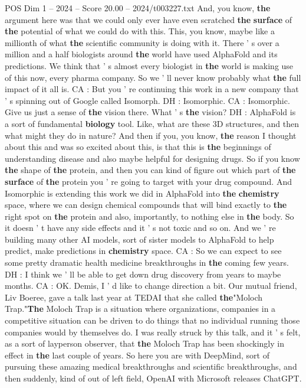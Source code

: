 \begin{textsample}{POS Dim 1 – 2024 – Score 20.00 – 2024/t003227.txt}
And, you know, \textbf{the} argument here was that we could only ever have even scratched \textbf{the} \textbf{surface} of \textbf{the} potential of what we could do with this.
This, you know, maybe like a millionth of what \textbf{the} scientific community is doing with it.
There ' s over a million and a half biologists around \textbf{the} world have used AlphaFold and its predictions.
We think that ' s almost every biologist in \textbf{the} world is making use of this now, every pharma company.
So we ' ll never know probably what \textbf{the} full impact of it all is.
CA : But you ' re continuing this work in a new company that ' s spinning out of Google called Isomorph.
DH : Isomorphic.
CA : Isomorphic.
Give us just a sense of \textbf{the} vision there.
What ' s \textbf{the} vision?
DH : AlphaFold is a sort of fundamental \textbf{biology} tool.
Like, what are these 3D structures, and then what might they do in nature?
And then if you, you know, \textbf{the} reason I thought about this and was so excited about this, is that this is \textbf{the} beginnings of understanding disease and also maybe helpful for designing drugs.
So if you know \textbf{the} shape of \textbf{the} protein, and then you can kind of figure out which part of \textbf{the} \textbf{surface} of \textbf{the} protein you ' re going to target with your drug compound.
And Isomorphic is extending this work we did in AlphaFold into \textbf{the} \textbf{chemistry} space, where we can design chemical compounds that will bind exactly to \textbf{the} right spot on \textbf{the} protein and also, importantly, to nothing else in \textbf{the} body.
So it doesn ' t have any side effects and it ' s not toxic and so on.
And we ' re building many other AI models, sort of sister models to AlphaFold to help predict, make predictions in \textbf{chemistry} space.
CA : So we can expect to see some pretty dramatic health medicine breakthroughs in \textbf{the} coming few years.
DH : I think we ' ll be able to get down drug discovery from years to maybe months.
CA : OK.
Demis, I ' d like to change direction a bit.
Our mutual friend, Liv Boeree, gave a talk last year at TEDAI that she called \textbf{the}"Moloch Trap."\textbf{The} Moloch Trap is a situation where organizations, companies in a competitive situation can be driven to do things that no individual running those companies would by themselves do.
I was really struck by this talk, and it ' s felt, as a sort of layperson observer, that \textbf{the} Moloch Trap has been shockingly in effect in \textbf{the} last couple of years.
So here you are with DeepMind, sort of pursuing these amazing medical breakthroughs and scientific breakthroughs, and then suddenly, kind of out of left field, OpenAI with Microsoft releases ChatGPT.

\end{textsample}
